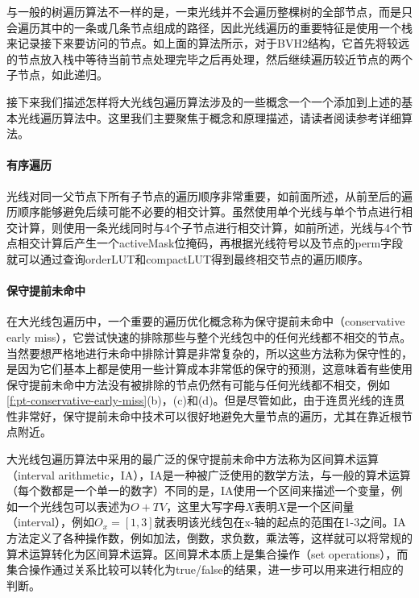 与一般的树遍历算法不一样的是，一束光线并不会遍历整棵树的全部节点，而是只会遍历其中的一条或几条节点组成的路径，因此光线遍历的重要特征是使用一个栈来记录接下来要访问的节点。如上面的算法所示，对于BVH2结构，它首先将较远的节点放入栈中等待当前节点处理完毕之后再处理，然后继续遍历较近节点的两个子节点，如此递归。

接下来我们描述怎样将大光线包遍历算法涉及的一些概念一个一个添加到上述的基本光线遍历算法中。这里我们主要聚焦于概念和原理描述，请读者阅读\cite{a:EfficientRayTracingKernelsforModernCPUArchitectures}参考详细算法。





\paragraph{有序遍历}
光线对同一父节点下所有子节点的遍历顺序非常重要，如前面所述，从前至后的遍历顺序能够避免后续可能不必要的相交计算。虽然\cite{a:RayTracingDeformableScenesUsingDynamicBoundingVolumeHierarchies}使用单个光线与单个节点进行相交计算，\cite{a:EfficientRayTracingKernelsforModernCPUArchitectures}则使用一条光线同时与4个子节点进行相交计算，如前所述，光线与4个节点相交计算后产生一个activeMask位掩码，再根据光线符号以及节点的perm字段就可以通过查询orderLUT和compactLUT得到最终相交节点的遍历顺序。








\paragraph{保守提前未命中}
在大光线包遍历中，一个重要的遍历优化概念称为保守提前未命中（conservative early miss），它尝试快速的排除那些与整个光线包中的任何光线都不相交的节点。当然要想严格地进行未命中排除计算是非常复杂的，所以这些方法称为保守性的，是因为它们基本上都是使用一些计算成本非常低的保守的预测，这意味着有些使用保守提前未命中方法没有被排除的节点仍然有可能与任何光线都不相交，例如\ref{f:pt-conservative-early-miss}(b)，(c)和(d)。但是尽管如此，由于连贯光线的连贯性非常好，保守提前未命中技术可以很好地避免大量节点的遍历，尤其在靠近根节点附近。

大光线包遍历算法中采用的最广泛的保守提前未命中方法称为区间算术运算（interval arithmetic，IA），IA是一种被广泛使用的数学方法，与一般的算术运算（每个数都是一个单一的数字）不同的是，IA使用一个区间来描述一个变量，例如一个光线包可以表述为$O+TV$，这里大写字母$X$表明$X$是一个区间量（interval），例如$O_x=[1,3]$就表明该光线包在x-轴的起点的范围在1-3之间。IA方法定义了各种操作数，例如加法，倒数，求负数，乘法等，这样就可以将常规的算术运算转化为区间算术运算。区间算术本质上是集合操作（set operations），而集合操作通过关系比较可以转化为true/false的结果，进一步可以用来进行相应的判断。

